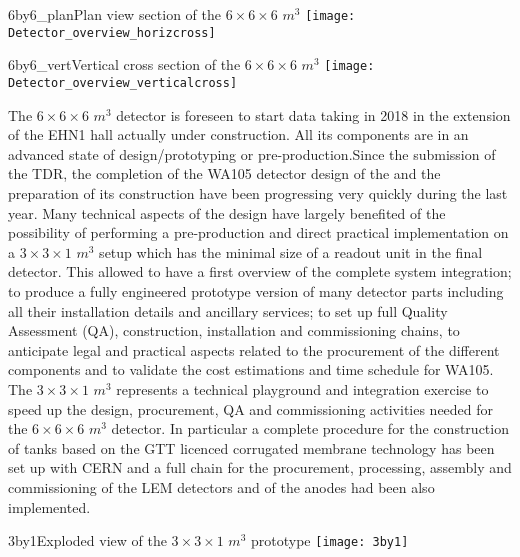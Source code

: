 \begin{cdrfigure}{6by6_plan}{\small Plan view section of the $6\times 6\times 6$ $m^3$ }
\texttt{[image: Detector\_overview\_horizcross]}
\end{cdrfigure}

\begin{cdrfigure}{6by6_vert}{\small Vertical cross section of the $6\times 6\times 6$ $m^3$}
\texttt{[image: Detector\_overview\_verticalcross]}
\end{cdrfigure}


The $6\times 6\times 6$ $m^3$  detector is foreseen to start data taking in 2018 in the extension of the EHN1 hall actually under construction. All its components are in an advanced state of design/prototyping or pre-production.Since the submission of the TDR, the completion of the WA105 detector design of the  and the preparation of its construction have been progressing very quickly during the last year. Many technical aspects of the design have largely benefited of the possibility of performing a pre-production and direct practical implementation on a  $3 \times 3 \times 1$ $m^3$  setup which has the minimal size of a readout unit in the final detector.  This allowed to have a first overview of the complete system integration; to produce a fully engineered prototype version of many detector parts including all their installation details and ancillary services; to set up full Quality Assessment (QA), construction, installation and commissioning chains, to anticipate legal and practical aspects related to the procurement of the different components and to validate the cost estimations and time schedule for WA105.  The  $3 \times 3 \times 1$ $m^3$   represents a technical playground and integration exercise to speed up the design, procurement, QA and commissioning activities needed for the  $6\times 6\times 6$ $m^3$ detector.  In particular a complete procedure for the construction of tanks based on the GTT licenced corrugated membrane technology has been set up with CERN and a full chain for the procurement, processing, assembly and commissioning of the LEM detectors and of the anodes had been also implemented.

\begin{cdrfigure}{3by1}{Exploded view of the  $3\times 3\times 1$  $m^3$  prototype}
\texttt{[image: 3by1]}
\end{cdrfigure}







